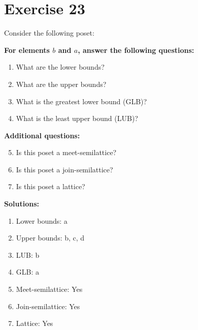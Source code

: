 \documentclass{article}
\begin{document}
\section*{Exercise 23}
Consider the following poset:
\begin{center}
\end{center}

    \textbf{For elements $b$ and $a$, answer the following questions:}
\begin{enumerate}
    \item What are the lower bounds?
    \item What are the upper bounds?
    \item What is the greatest lower bound (GLB)?
    \item What is the least upper bound (LUB)?
\end{enumerate}
    \hspace*{3ex} \textbf{Additional questions:}
\begin{enumerate}
    \setcounter{enumi}{4}
    \item Is this poset a meet-semilattice?
    \item Is this poset a join-semilattice?
    \item Is this poset a lattice?
\end{enumerate}

\textbf{Solutions:}
\begin{enumerate}
    \item Lower bounds: {a}
    \item Upper bounds: {b, c, d}
    \item LUB: b
    \item GLB: a
    \item Meet-semilattice: Yes
    \item Join-semilattice: Yes
    \item Lattice: Yes
\end{enumerate}
\newpage
\end{document}
